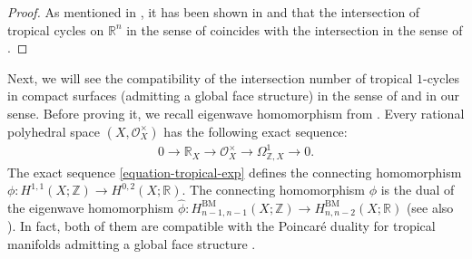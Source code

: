 \documentclass[a4paper,dvipdfmx,reqno,12pt]{amsart}
\theoremstyle{definition}
\numberwithin{equation}{section}
\begin{document}
\begin{proof}
As mentioned in \cite[]{MR3032930},
it has been shown in \cite{MR3529085} and \cite{MR2887109}
that the intersection of tropical cycles on
$\mathbb{R}^n$ in the sense of \cite{MR2591823}
coincides with the intersection in the sense of
\cite{MR2149011,MR2275625}.
\end{proof}

Next, we will see the compatibility of
the intersection number of tropical $1$-cycles
in compact surfaces (admitting a global face structure)
in the sense of \cite{shaw2015tropical,demedrano2023chern}
and in our sense. Before proving it,
we recall eigenwave homomorphism from
\cite{MR3961331,MR3894860}.
Every rational polyhedral space $(X,\mathcal{O}_X^{\times})$
has the following exact sequence:
\begin{align}
\label{equation-tropical-exp}
0\to \mathbb{R}_X \to 
\mathcal{O}_X^{\times} \to \Omega_{\mathbb{Z},X}^{1}\to 0.
\end{align}
The exact sequence \eqref{equation-tropical-exp}
defines
the connecting homomorphism
$\phi \colon H^{1,1}(X;\mathbb{Z})
\to H^{0,2}(X;\mathbb{R})$.
The connecting homomorphism
$\phi$ is the dual of the
eigenwave homomorphism
$\hat{\phi} \colon
H_{n-1,n-1}^{\mathrm{BM}}(X;\mathbb{Z})
\to H_{n,n-2}^{\mathrm{BM}}(X;\mathbb{R})$
\cite[(5.2)]{MR3330789}
(see also \cite[Definition 2.9]{MR3894860}).
In fact, both of them are compatible with 
the Poincar\'e duality for tropical manifolds
admitting a global face structure
\cite[Lemma 5.13]{MR3894860}.
\end{document}
